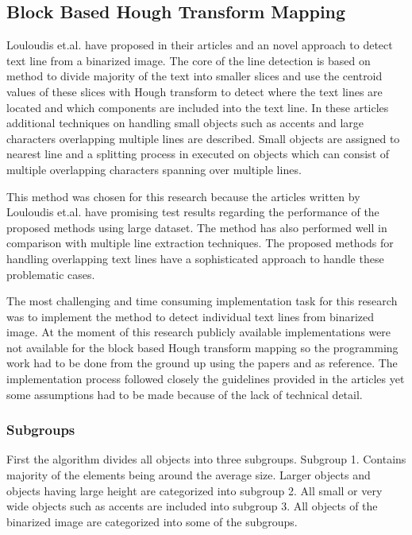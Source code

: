 \documentclass{article}
\begin{document}
        \subsection{Block Based Hough Transform Mapping}
          Louloudis et.al. have proposed in their articles \cite{Louloudis1} and \cite{Louloudis2} an novel approach to detect text line from a binarized image. The core of the line detection is based on method to divide majority of the text into smaller slices and use the centroid values of these slices with Hough transform to detect where the text lines are located and which components are included into the text line. In these articles additional techniques on handling small objects such as accents and large characters overlapping multiple lines are described. Small objects are assigned to nearest line and a splitting process in executed on objects which can consist of multiple overlapping characters spanning over multiple lines.

          This method was chosen for this research because the articles written by Louloudis et.al. have promising test results regarding the performance of the proposed methods using large dataset. The method has also performed well in comparison with multiple line extraction techniques.\cite{Razak} The proposed methods for handling overlapping text lines have a sophisticated approach to handle these problematic cases.

          The most challenging and time consuming implementation task for this research was to implement the method to detect individual text lines from binarized image. At the moment of this research publicly available implementations were not available for the block based Hough transform mapping so the programming work had to be done from the ground up using the papers \cite{Louloudis1} and \cite{Louloudis2} as reference. The implementation process followed closely the guidelines provided in the articles yet some assumptions had to be made because of the lack of technical detail.

          \subsubsection{Subgroups}
            First the algorithm divides all objects into three subgroups. Subgroup 1. Contains majority of the elements being around the average size. Larger objects and objects having large height are categorized into subgroup 2. All small or very wide objects such as accents are included into subgroup 3. All objects of the binarized image are categorized into some of the subgroups.
\end{document}
